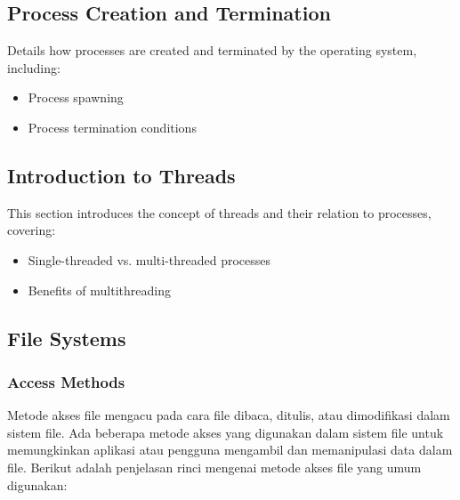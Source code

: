 \documentclass[12pt]{article}
\begin{document}
\subsection{Process Creation and Termination}
Details how processes are created and terminated by the operating system, including:
\begin{itemize}
    \item Process spawning
    \item Process termination conditions
\end{itemize}

\subsection{Introduction to Threads}
This section introduces the concept of threads and their relation to processes, covering:
\begin{itemize}
    \item Single-threaded vs. multi-threaded processes
    \item Benefits of multithreading
\end{itemize}

\subsection{File Systems}
\subsubsection{Access Methods}
Metode akses file mengacu pada cara file dibaca, ditulis, atau dimodifikasi dalam sistem file. Ada beberapa metode akses yang digunakan dalam sistem file untuk memungkinkan aplikasi atau pengguna mengambil dan memanipulasi data dalam file. Berikut adalah penjelasan rinci mengenai metode akses file yang umum digunakan:
\end{document}
